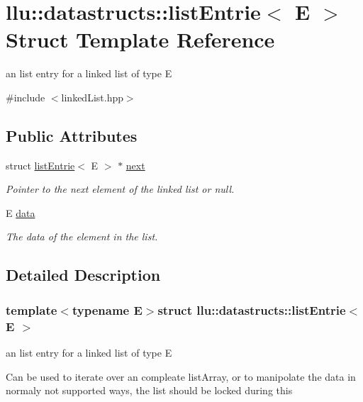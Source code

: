 \hypertarget{structllu_1_1datastructs_1_1list_entrie}{\section{llu\+:\+:datastructs\+:\+:list\+Entrie$<$ E $>$ Struct Template Reference}
\label{structllu_1_1datastructs_1_1list_entrie}
}


an list entry for a linked list of type E  




{\ttfamily \#include $<$linked\+List.\+hpp$>$}

\subsection*{Public Attributes}
\begin{DoxyCompactItemize}
\item 
struct \hyperlink{structllu_1_1datastructs_1_1list_entrie}{list\+Entrie}$<$ E $>$ $\ast$ \hyperlink{structllu_1_1datastructs_1_1list_entrie_a3a0c3cef3ce8b0b9beaa1c6360fb6346}{next}
\begin{DoxyCompactList}\small\item\em Pointer to the next element of the linked list or null. \end{DoxyCompactList}\item 
E \hyperlink{structllu_1_1datastructs_1_1list_entrie_ae45377a6f71b68a0bd56844aedc52fb7}{data}
\begin{DoxyCompactList}\small\item\em The data of the element in the list. \end{DoxyCompactList}\end{DoxyCompactItemize}


\subsection{Detailed Description}
\subsubsection*{template$<$typename E$>$struct llu\+::datastructs\+::list\+Entrie$<$ E $>$}

an list entry for a linked list of type E 

Can be used to iterate over an compleate list\+Array, or to manipolate the data in normaly not supported ways, the list should be locked during this 

